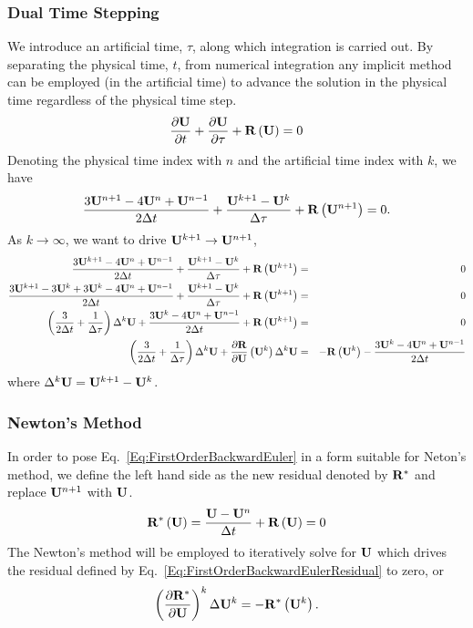 \documentclass[a4paper]{article}
\begin{document}
\subsubsection{Dual Time Stepping}

We introduce an artificial time, $\tau$, along which integration is carried out. By separating the physical time, $t$, from numerical integration any implicit method can be employed (in the artificial time) to advance the solution in the physical time regardless of the physical time step.
\begin{equation}
\frac{\partial\mathbf{U}}{\partial t} + \frac{\partial\mathbf{U}}{\partial \tau} + \mathbf{R}\left(\mathbf{U}\right) = 0
\end{equation}
Denoting the physical time index with $n$ and the artificial time index with $k$, we have
\[
\frac{3\mathbf{U}^{n+1} - 4\mathbf{U}^n + \mathbf{U}^{n-1}}{2\Delta t} + \frac{\mathbf{U}^{k+1} - \mathbf{U}^k}{\Delta \tau} +\mathbf{R}\left(\mathbf{U}^{n+1}\right) = 0.
\]
As $k \rightarrow \infty$, we want to drive $\mathbf{U}^{k + 1} \rightarrow \mathbf{U}^{n + 1}$,
\begin{eqnarray}
\frac{3\mathbf{U}^{k+1} - 4\mathbf{U}^n + \mathbf{U}^{n-1}}{2\Delta t} + \frac{\mathbf{U}^{k+1} - \mathbf{U}^k}{\Delta \tau} +\mathbf{R}\left(\mathbf{U}^{k+1}\right) &=& 0 \nonumber \\
\frac{3\mathbf{U}^{k+1} - 3\mathbf{U}^k + 3\mathbf{U}^k - 4\mathbf{U}^n + \mathbf{U}^{n-1}}{2\Delta t} + \frac{\mathbf{U}^{k+1} - \mathbf{U}^k}{\Delta \tau} +\mathbf{R}\left(\mathbf{U}^{k+1}\right) &=& 0 \nonumber \\
\left(\frac{3}{2\Delta t} + \frac{1}{\Delta \tau}\right) \Delta^k\mathbf{U} + \frac{3\mathbf{U}^k - 4\mathbf{U}^n + \mathbf{U}^{n-1}}{2\Delta t} +\mathbf{R}\left(\mathbf{U}^{k+1}\right) &=& 0 \nonumber \\
\left(\frac{3}{2\Delta t} + \frac{1}{\Delta \tau}\right) \Delta^k\mathbf{U} + \frac{\partial\mathbf{R}}{\partial\mathbf{U}}\left(\mathbf{U}^k\right) \Delta^k\mathbf{U} &=& -\mathbf{R}\left(\mathbf{U}^k\right) - \frac{3\mathbf{U}^k - 4\mathbf{U}^n + \mathbf{U}^{n-1}}{2\Delta t}
\end{eqnarray}
where $\Delta^k\mathbf{U} = \mathbf{U}^{k+1} - \mathbf{U}^k$.

\subsubsection{Newton's Method}

In order to pose Eq.~\ref{Eq:FirstOrderBackwardEuler} in a form suitable for Neton's method, we define the left hand side as the new residual denoted by $\mathbf{R}^*$ and replace $\mathbf{U}^{n+1}$ with $\mathbf{U}$.
\begin{equation}
\mathbf{R}^*\left(\mathbf{U}\right) =
\frac{\mathbf{U} - \mathbf{U}^n}{\Delta t} + \mathbf{R}\left(\mathbf{U}\right) = 0
\label{Eq:FirstOrderBackwardEulerResidual}
\end{equation}
The Newton's method will be employed to iteratively solve for $\mathbf{U}$ which drives the residual defined by Eq.~\ref{Eq:FirstOrderBackwardEulerResidual} to zero, or
\begin{equation}
\left(\frac{\partial \mathbf{R}^*}{\partial\mathbf{U}}\right)^k
\Delta \mathbf{U}^k
=
-\mathbf{R}^*\left(\mathbf{U}^k\right).
\end{equation}
\end{document}
